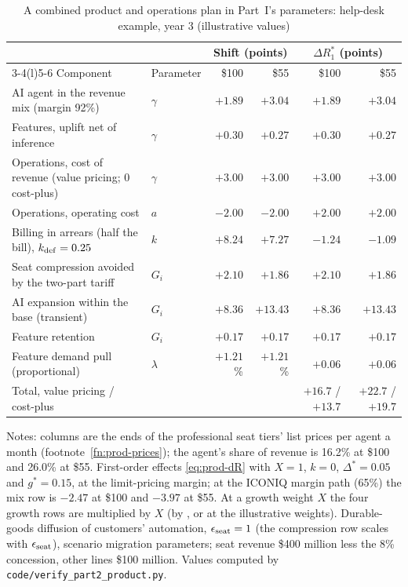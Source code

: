 \begin{table}[t]
\centering
\caption{A combined product and operations plan in Part~I's parameters: help-desk example, year 3 (illustrative values)}\label{tab:prod-plan}
\footnotesize
\begin{tabular}{@{}llrrrr@{}}
\toprule
& & \multicolumn{2}{c}{Shift (points)} & \multicolumn{2}{c}{$\Delta R_1^*$ (points)}\\
\cmidrule(lr){3-4}\cmidrule(l){5-6}
Component & Parameter & \$100 & \$55 & \$100 & \$55\\
\midrule
AI agent in the revenue mix (margin 92\%) & $\gamma$ & $+1.89$ & $+3.04$ & $+1.89$ & $+3.04$\\
Features, uplift net of inference & $\gamma$ & $+0.30$ & $+0.27$ & $+0.30$ & $+0.27$\\
Operations, cost of revenue (value pricing; 0 cost-plus) & $\gamma$ & $+3.00$ & $+3.00$ & $+3.00$ & $+3.00$\\
Operations, operating cost & $a$ & $-2.00$ & $-2.00$ & $+2.00$ & $+2.00$\\
Billing in arrears (half the bill), $k_{\rm def}=0.25$ & $k$ & $+8.24$ & $+7.27$ & $-1.24$ & $-1.09$\\
Seat compression avoided by the two-part tariff & $G_i$ & $+2.10$ & $+1.86$ & $+2.10$ & $+1.86$\\
AI expansion within the base (transient) & $G_i$ & $+8.36$ & $+13.43$ & $+8.36$ & $+13.43$\\
Feature retention & $G_i$ & $+0.17$ & $+0.17$ & $+0.17$ & $+0.17$\\
Feature demand pull (proportional) & $\lambda$ & $+1.21$\% & $+1.21$\% & $+0.06$ & $+0.06$\\
\midrule
Total, value pricing / cost-plus & & & & $+16.7$ / $+13.7$ & $+22.7$ / $+19.7$\\
\bottomrule
\end{tabular}

\smallskip
\begin{minipage}{0.95\linewidth}\footnotesize
Notes: columns are the ends of the professional seat tiers' list prices per agent a month (footnote~\ref{fn:prod-prices}); the agent's share of revenue is 16.2\% at \$100 and 26.0\% at \$55. First-order effects \eqref{eq:prod-dR} with $X=1$, $k=0$, $\Delta^*=0.05$ and $g^*=0.15$, at the limit-pricing margin; at the ICONIQ margin path (65\%) the mix row is $-2.47$ at \$100 and $-3.97$ at \$55. At a growth weight $X$ the four growth rows are multiplied by $X$ (by \prodXbOne, \prodXbTwo{} or \prodXbThree{} at the illustrative weights). %
Durable-goods diffusion of customers' automation, $\epsilon_{\rm seat}=1$ (the compression row scales with $\epsilon_{\rm seat}$), scenario migration parameters; seat revenue \$400 million less the 8\% concession, other lines \$100 million. Values computed by \texttt{code/verify\_part2\_product.py}.
\end{minipage}
\end{table}

